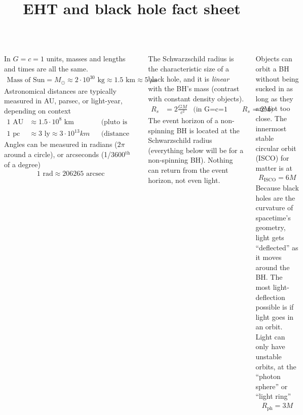 \documentclass[25pt, a0paper, landscape]{tikzposter}
\title{EHT and black hole fact sheet}
\begin{document}
 
\maketitle

\linespread{1.25}

\begin{columns}
    {
      In $G=c=1$ units, masses and lengths and times are all the same.
      \begin{align*}
        \text{Mass of Sun} = M_{\odot} \approx 2\cdot 10^{30} \text{~kg}
        \approx 1.5 \text{~km} \approx 5 ~\mu\text{s}
      \end{align*}
      Astronomical distances are typically measured in AU, parsec, or
      light-year, depending on context
      \begin{align*}
        1 \text{~AU} &\approx 1.5\cdot 10^8 \text{~km} && \text{(pluto is at ~40 AU)} \\
        1 \text{~pc} &\approx 3 \text{~ly} \approx 3\cdot 10^{13} km	&&	\text{(distance to Alpha Cen is 1.3 pc)}
      \end{align*}
      Angles can be measured in radians ($2\pi$ around a circle), or
      arcseconds (1/3600$^{\text{th}}$ of a degree)
      \begin{align*}
        1 \text{~rad} \approx 206265 \text{~arcsec}
      \end{align*}

    }

    {\setlength{\parskip}{1cm plus 4mm minus 3mm}

      The Schwarzschild radius is the characteristic size of a black
      hole, and it is \emph{linear} with the BH’s mass (contrast with
      constant density objects).
        \begin{align*}
          R_{s} &= 2\frac{GM}{c^{2}} & \text{(in G=c=1 units, simply $R_s$ = 2M)}
        \end{align*}
      The event horizon of a non-spinning BH is located at the
      Schwarzschild radius (everything below will be for a
      non-spinning BH). Nothing can return from the event horizon, not
      even light.

      Objects can orbit a BH without being sucked in as long as they
      are not too close. The innermost stable circular orbit (ISCO)
      for matter is at
      \begin{align*}
        R_{\text{ISCO}} = 6M
      \end{align*}
      Because black holes are the curvature of spacetime’s geometry,
      light gets ``deflected'' as it moves around the BH. The most
      light-deflection possible is if light goes in an orbit. Light
      can only have unstable orbits, at the ``photon sphere'' or
      ``light ring''
      \begin{align*}
        R_{\text{ph}} = 3M
      \end{align*}

}
\end{columns}
\end{document}
